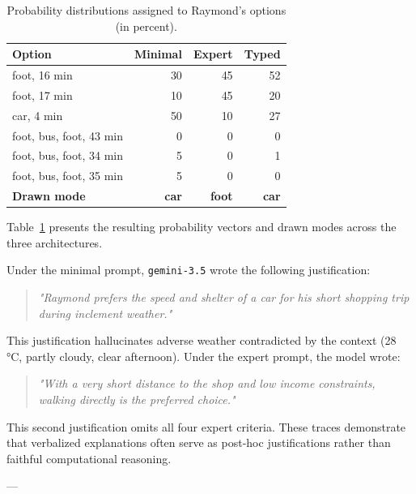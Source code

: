 \begin{table}[h]
\centering
\caption{Probability distributions assigned to Raymond's options (in percent).}
\label{tab-raymond-options}
\small
\begin{tabular}{lrrr}
\toprule
\textbf{Option} & \textbf{Minimal} & \textbf{Expert} & \textbf{Typed} \\
\midrule
[0] foot, 16 min & 30 & 45 & 52 \\
[1] foot, 17 min & 10 & 45 & 20 \\
[2] car, 4 min & 50 & 10 & 27 \\
[3] foot, bus, foot, 43 min & 0 & 0 & 0 \\
[4] foot, bus, foot, 34 min & 5 & 0 & 1 \\
[5] foot, bus, foot, 35 min & 5 & 0 & 0 \\
\midrule
\textbf{Drawn mode} & \textbf{car} & \textbf{foot} & \textbf{car} \\
\bottomrule
\end{tabular}
\end{table}

Table~\ref{tab-raymond-options} presents the resulting probability vectors and drawn modes across the three architectures.





Under the minimal prompt, \texttt{gemini-3.5} wrote the following justification:
\begin{quote}
\emph{"Raymond prefers the speed and shelter of a car for his short shopping trip during inclement weather."}
\end{quote}

This justification hallucinates adverse weather contradicted by the context (28 °C, partly cloudy, clear afternoon). Under the expert prompt, the model wrote:
\begin{quote}
\emph{"With a very short distance to the shop and low income constraints, walking directly is the preferred choice."}
\end{quote}

This second justification omits all four expert criteria. These traces demonstrate that verbalized explanations often serve as post-hoc justifications rather than faithful computational reasoning.

---
